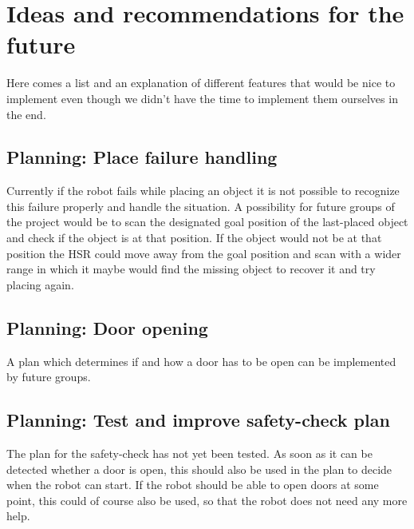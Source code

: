 \documentclass[main.tex]{subfiles}
\begin{document}
	\begingroup

	\renewcommand{\cleardoublepage}{}

	\renewcommand{\clearpage}{}

	\chapter{Ideas and recommendations for the future}
		
		Here comes a list and an explanation of different features that would be nice to implement even though we didn't have the time to implement them ourselves in the end.
		
		\section{Planning: Place failure handling}
		Currently if the robot fails while placing an object it is not possible to recognize this failure properly and handle the situation. A possibility for future groups of the project would be to scan the designated goal position of the last-placed object and check if the object is at that position. If the object would not be at that position the HSR could move away from the goal position and scan with a wider range in which it maybe would find the missing object to recover it and try placing again.
		
		\section{Planning: Door opening}
		A plan which determines if and how a door has to be open can be implemented by future groups.
		
		\section{Planning: Test and improve safety-check plan}
		The plan for the safety-check has not yet been tested. As soon as it can be detected whether a door is open, this should also be used in the plan to decide when the robot can start. If the robot should be able to open doors at some point, this could of course also be used, so that the robot does not need any more help.
		
\end{document}
